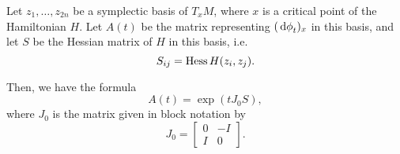 \begin{prop}\label{prop:dphimatrix}
Let $z_1, \dots, z_{2n}$ be a symplectic basis of $T_x M$, where $x$ is a critical point of the Hamiltonian $H$. Let $A(t)$ be the matrix representing $(\dl \phi_t)_x$ in this basis, and let $S$ be the Hessian matrix of $H$ in this basis, i.e.
\begin{equation}
S_{ij} = \operatorname{Hess} H(z_i, z_j).
\end{equation}

Then, we have the formula
\begin{equation}
A(t) = \exp(t J_0 S),
\end{equation}
where $J_0$ is the matrix given in block notation by
\begin{equation}
J_0 = \begin{bmatrix} 0 & -I \\ I & 0 \end{bmatrix}.
\end{equation}
\end{prop}


